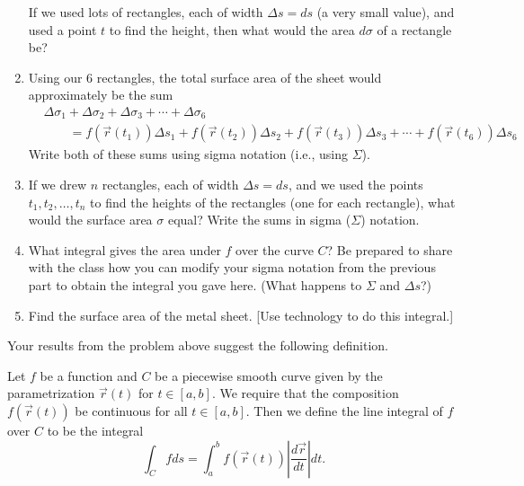 \begin{problem}
\begin{enumerate}
If we used lots of rectangles, each of width $\Delta s = ds$ (a very small value), and used a point $t$ to find the height, then what would the area $d\sigma$ of a rectangle be?

\item Using our 6 rectangles, the total surface area of the sheet would approximately be the sum
\begin{equation*}
\begin{split}
&\Delta \sigma_1 + \Delta \sigma_2 + \Delta \sigma_3 + \cdots + \Delta \sigma_6\\
& \qquad =
f(\vec r(t_1))\Delta s_1+
f(\vec r(t_2))\Delta s_2+
f(\vec r(t_3))\Delta s_3+\cdots+
f(\vec r(t_6))\Delta s_6
\end{split}
\end{equation*}
Write both of these sums using sigma notation (i.e., using $\Sigma$).

\item If we drew $n$ rectangles, each of width $\Delta s=ds$, and we used the points $t_1,t_2,\ldots,t_n$ to find the heights of the rectangles (one for each rectangle), what would the surface area $\sigma$ equal?  Write the sums in sigma ($\Sigma$) notation.


\item What integral gives the area under $f$ over the curve $C$? Be prepared to share with the class how you can modify your sigma notation from the previous part to obtain the integral you gave here. (What happens to $\Sigma$ and $\Delta s$?)
\item Find the surface area of the metal sheet. [Use technology to do this integral.]
\end{enumerate}
\end{problem}

Your results from the problem above suggest the following definition.
\begin{definition}%
 Let $f$ be a function and $C$ be a piecewise smooth curve given by the parametrization $\vec r(t)$ for $t\in[a,b]$. We require that the composition $f(\vec r(t))$ be continuous for all $t\in [a,b]$. Then we define the line integral
of $f$ over $C$ to be the integral 
$$\int_C f ds = \int_a^b f(\vec r(t))\left|\frac{d\vec r}{dt}\right|dt.$$
\end{definition}

